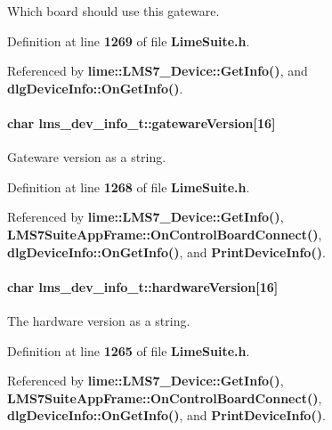 Which board should use this gateware. 



Definition at line {\bf 1269} of file {\bf Lime\+Suite.\+h}.



Referenced by {\bf lime\+::\+L\+M\+S7\+\_\+\+Device\+::\+Get\+Info()}, and {\bf dlg\+Device\+Info\+::\+On\+Get\+Info()}.

\paragraph[{gateware\+Version}]{\setlength{\rightskip}{0pt plus 5cm}char lms\+\_\+dev\+\_\+info\+\_\+t\+::gateware\+Version[16]}\label{structlms__dev__info__t_a455cf9642472677e00d409476b498d77}


Gateware version as a string. 



Definition at line {\bf 1268} of file {\bf Lime\+Suite.\+h}.



Referenced by {\bf lime\+::\+L\+M\+S7\+\_\+\+Device\+::\+Get\+Info()}, {\bf L\+M\+S7\+Suite\+App\+Frame\+::\+On\+Control\+Board\+Connect()}, {\bf dlg\+Device\+Info\+::\+On\+Get\+Info()}, and {\bf Print\+Device\+Info()}.

\paragraph[{hardware\+Version}]{\setlength{\rightskip}{0pt plus 5cm}char lms\+\_\+dev\+\_\+info\+\_\+t\+::hardware\+Version[16]}\label{structlms__dev__info__t_a46ba3be8cf71a94d33d46126a9257576}


The hardware version as a string. 



Definition at line {\bf 1265} of file {\bf Lime\+Suite.\+h}.



Referenced by {\bf lime\+::\+L\+M\+S7\+\_\+\+Device\+::\+Get\+Info()}, {\bf L\+M\+S7\+Suite\+App\+Frame\+::\+On\+Control\+Board\+Connect()}, {\bf dlg\+Device\+Info\+::\+On\+Get\+Info()}, and {\bf Print\+Device\+Info()}.

